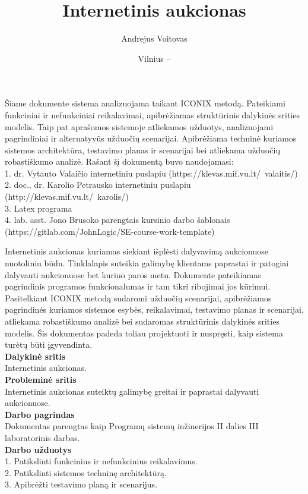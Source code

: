 \documentclass{VUMIFPSkursinis}
\title{Internetinis aukcionas}
\author{Andrejus Voitovas}
\date{Vilnius – \the\year}
\begin{document}
	\maketitle
	\cleardoublepage{}
	\setcounter{page}{2}
	Šiame dokumente sistema analizuojama taikant ICONIX metodą. Pateikiami funkciniai ir nefunkciniai reikalavimai, apibrėžiamas struktūrinis dalykinės srities modelis. Taip pat aprašomos sistemoje atliekamos užduotys, analizuojami pagrindiniai ir alternatyvūs užduočių scenarijai. Apibrėžiama
	techninė kuriamos sistemos architektūra, testavimo planas ir scenarijai bei atliekama užduočių robastiškumo analizė. Rašant šį dokumentą buvo naudojamasi:
	\\1. dr. Vytauto Valaičio internetiniu puslapiu (https://klevas.mif.vu.lt/~valaitis/)
	\\2. doc., dr. Karolio Petrausko internetiniu puslapiu (http://klevas.mif.vu.lt/~karolis/)
	\\3. Latex programa
	\\4. lab. asst. Jono Brusoko parengtais kursinio darbo šablonais (https://gitlab.com/JohnLogic/SE-course-work-template)
	\newpage
	\tableofcontents
	
	Internetinis aukcionas kuriamas siekiant išplėsti dalyvavimą aukcionuose nuotoliniu
	būdu. Tinklalapis suteikia galimybę klientams paprastai ir patogiai dalyvauti aukcionuose bet kuriuo paros metu. Dokumente pateikiamas pagrindinis programos funkcionalumas ir tam tikri ribojimai jos kūrimui. Pasitelkiant ICONIX metodą sudaromi užduočių scenarijai, apibrėžiamos pagrindinės kuriamos sistemos esybės, reikalavimai, testavimo planas ir scenarijai, atliekama robastiškumo analizė bei sudaromas struktūrinis dalykinės srities modelis. Šis dokumentas padeda toliau projektuoti ir nuspręsti, kaip sistema turėtų būti įgyvendinta.
	\\\textbf{Dalykinė sritis}
	\\Internetinis aukcionas.
	\\\textbf{Probleminė sritis} 
	\\Internetinis aukcionas suteiktų galimybę greitai ir paprastai dalyvauti aukcionuose.
	\\\textbf{Darbo pagrindas}
	\\Dokumentas parengtas kaip Programų sistemų inžinerijos II dalies III laboratorinis darbas.
	\\\textbf{Darbo užduotys}
	\\1. Patikslinti funkcinius ir nefunkcinius reikalavimus.
	\\2. Patikslinti sistemos techninę architektūrą.
	\\3. Apibrėžti testavimo planą ir scenarijus.
	\newpage
\end{document}

